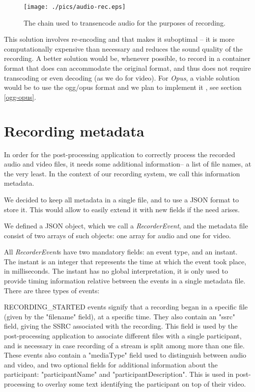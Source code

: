 \documentclass[twoside,openright,a4paper,12pt,english]{article}
\begin{document}
\begin{figure}[h]
    \texttt{[image: ./pics/audio-rec.eps]}
    \caption{The chain used to transencode audio for the purposes of recording.}
    \label{audio-rec}
\end{figure}

This solution involves re-encoding and that makes it suboptimal -- it is 
more computationally expensive than necessary and reduces the sound quality of the recording.
A better solution would be, whenever possible, to record in a container format
that does can accommodate the original format, and thus does not require
transcoding or even decoding (as we do for video). For \emph{Opus}, a viable
solution would be to use the ogg/opus format and we plan to implement it , see
section \ref{ogg-opus}.






\section{Recording metadata}
\label{recording-metadata}
In order for the post-processing application to correctly process the recorded
audio and video files, it needs some additional information-- a list of file
names, at the very least. In the context of our recording system, we call this information
metadata.

We decided to keep all metadata in a single file, and to use a JSON
format to store it. This would allow to easily extend it with new fields if
the need arises.

We defined a JSON object, which we call a \emph{RecorderEvent}, and the
metadata file consist of two arrays of such objects: one array for audio and
one for video.

All \emph{RecorderEvent}s have two mandatory fields: an event type, and an
instant. The instant is an integer that represents the time at which the event
took place, in milliseconds. The instant has no global interpretation, it is only
used to provide timing information relative between the events in a single
metadata file. There are three types of events:



\smallskip
RECORDING\_STARTED events signify that a recording began in a specific file
(given by the "filename" field), at a specific time. They also contain an "ssrc" field, giving the
SSRC associated with the recording. This field is used by the post-processing
application to associate different files with a single participant, and is
necessary in case recording of a stream is split among more than one file.
These events also contain a "mediaType" field used to distinguish between audio and
video, and two optional fields for additional information about the
participant: "participantName" and "participantDescription". This is used in
post-processing to overlay some text identifying the participant on top of
their video.
\end{document}
